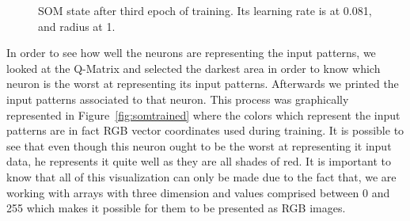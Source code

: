 \begin{figure}[htpb]
  \centering
  \hspace*{0.5cm}
  \hspace*{0.5cm}
  \hspace*{0.5cm}
  \caption{ SOM state after third epoch of training. Its learning rate is at 0.081, and radius at 1.  }
  \label{fig:}
\end{figure}

In order to see how well the neurons are representing the input patterns, we looked at the \ac{Q-Matrix} and selected the darkest area in order to know which neuron is the worst at representing its input patterns. Afterwards we printed the input patterns associated to that neuron. This process was graphically represented in Figure~\ref{fig:somtrained} where the colors which represent the input patterns are in fact RGB vector coordinates used during training. It is possible to see that even though this neuron ought to be the worst at representing it input data, he represents it quite well as they are all shades of red. 
It is important to know that all of this visualization can only be made due to the fact that, we are working with arrays with three dimension and values comprised between 0 and 255 which makes it possible for them to be presented as RGB images. 

